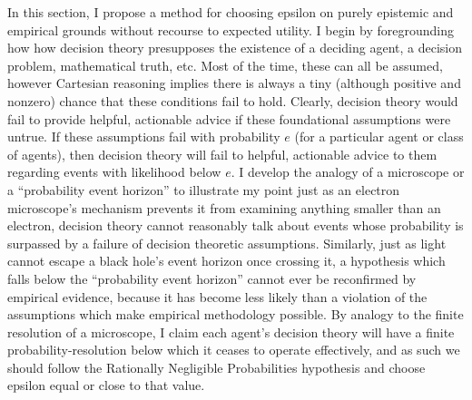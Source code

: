 In this section, I propose a method for choosing epsilon on purely epistemic and empirical grounds without recourse to expected utility. I begin by foregrounding how how decision theory presupposes the existence of a deciding agent, a decision problem, mathematical truth, etc. Most of the time, these can all be assumed, however Cartesian reasoning implies there is always a tiny (although positive and nonzero) chance that these conditions fail to hold. Clearly, decision theory would fail to provide helpful, actionable advice if these foundational assumptions were untrue. If these assumptions fail with probability \(e\) (for a particular agent or class of agents), then decision theory will fail to helpful, actionable advice to them regarding events with likelihood below \(e\). I develop the analogy of a microscope or a ``probability event horizon'' to illustrate my point \textemdash just as an electron microscope's mechanism prevents it from examining anything smaller than an electron, decision theory cannot reasonably talk about events whose probability is surpassed by a failure of decision theoretic assumptions. Similarly, just as light cannot escape a black hole's event horizon once crossing it, a hypothesis which falls below the ``probability event horizon'' cannot ever be reconfirmed by empirical evidence, because it has become less likely than a violation of the assumptions which make empirical methodology possible. By analogy to the finite resolution of a microscope, I claim each agent's decision theory will have a finite probability-resolution below which it ceases to operate effectively, and as such we should follow the Rationally Negligible Probabilities hypothesis and choose epsilon equal or close to that value.

